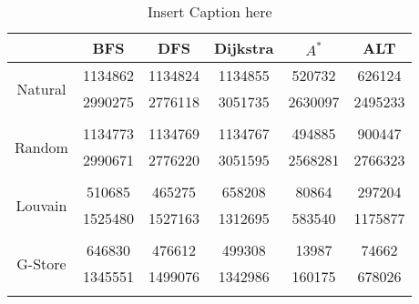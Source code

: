 \begin{table}
	\begin{center}
		 \begin{tabular}[c]{c c c c c c} \toprule
			  & BFS & DFS & Dijkstra & $A^*$  & ALT \\ \midrule 
 			\multirow{2}{*}{Natural}  & 1134862 & 1134824 & 1134855 & 520732 & 626124 \\ 
 				 & 2990275 & 2776118 & 3051735 & 2630097 & 2495233 \\ 
 				&&&&& \\[-0.5em]
 			\multirow{2}{*}{Random}  & 1134773 & 1134769 & 1134767 & 494885 & 900447 \\ 
 				 & 2990671 & 2776220 & 3051595 & 2568281 & 2766323 \\ 
 				&&&&& \\[-0.5em]
 			\multirow{2}{*}{Louvain}  & 510685 & 465275 & 658208 & 80864 & 297204 \\ 
 				 & 1525480 & 1527163 & 1312695 & 583540 & 1175877 \\ 
 				&&&&& \\[-0.5em]
 			\multirow{2}{*}{G-Store}  & 646830 & 476612 & 499308 & 13987 & 74662 \\ 
 				 & 1345551 & 1499076 & 1342986 & 160175 & 678026 \\ 
 				&&&&& \\[-0.5em]
 					\end{tabular}  
  	 \end{center}
	 \caption{ Insert Caption here}
\end{table}